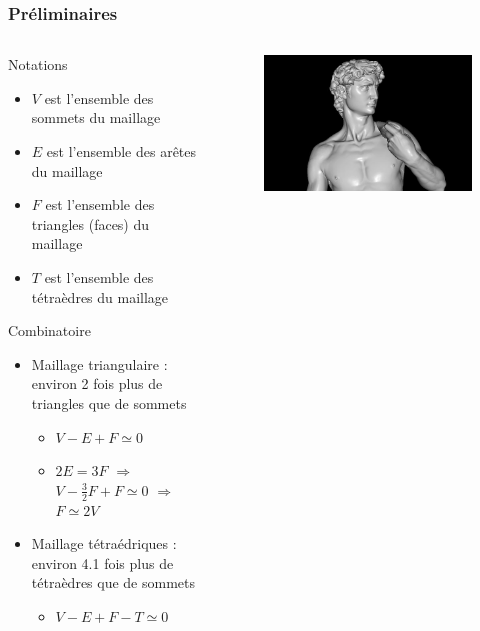 \documentclass[9pt]{beamer}
\begin{document}
\begin{frame}
\small
\frametitle{Préliminaires}

\begin{columns}[c]
    \begin{column}[c]{.6\textwidth}
 		\begin{block}{Notations}
\begin{itemize}
\item $V$ est l'ensemble des sommets du maillage
\item $E$ est l'ensemble des arêtes du maillage
\item $F$ est l'ensemble des triangles (faces) du maillage
\item $T$ est l'ensemble des tétraèdres du maillage
\end{itemize}
\end{block}
\begin{block}{Combinatoire}
\begin{itemize}
\item Maillage triangulaire : environ 2 fois plus de triangles que de sommets
\begin{itemize}
\item $V-E+F\simeq 0$
\item $2E=3F$ $\Rightarrow$ $V-\frac{3}{2}F+F\simeq 0$ $\Rightarrow$ $F\simeq 2V$
\end{itemize}
\item Maillage tétraédriques : environ 4.1 fois plus de tétraèdres que de sommets
\begin{itemize}
\item $V-E+F-T\simeq 0$
\end{itemize}
\end{itemize}
\end{block}
    \end{column}%
    \begin{column}[c]{.37\textwidth}
    \vspace{-15.5pt}
    \begin{figure}
    \includegraphics[scale=0.09]{../Images/michelangelo}

\end{figure}
\end{column}
\end{columns}
\end{frame}
\end{document}
